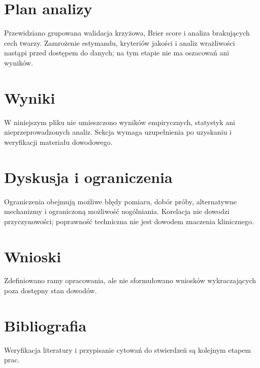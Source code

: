 \documentclass[11pt,a4paper]{article}
\begin{document}
\section{Plan analizy}

Przewidziano grupowana walidacja krzyżowa, Brier score i analiza brakujących cech twarzy. Zamrożenie estymandu, kryteriów jakości i analiz wrażliwości nastąpi przed dostępem do danych; na tym etapie nie ma oszacowań ani wyników.

\section{Wyniki}

W niniejszym pliku nie umieszczono wyników empirycznych, statystyk ani nieprzeprowadzonych analiz. Sekcja wymaga uzupełnienia po uzyskaniu i weryfikacji materiału dowodowego.

\section{Dyskusja i ograniczenia}

Ograniczenia obejmują możliwe błędy pomiaru, dobór próby, alternatywne mechanizmy i ograniczoną możliwość uogólniania. Korelacja nie dowodzi przyczynowości; poprawność techniczna nie jest dowodem znaczenia klinicznego.

\section{Wnioski}

Zdefiniowano ramy opracowania, ale nie sformułowano wniosków wykraczających poza dostępny stan dowodów.

\section*{Bibliografia}

Weryfikacja literatury i przypisanie cytowań do stwierdzeń są kolejnym etapem prac.
\end{document}
